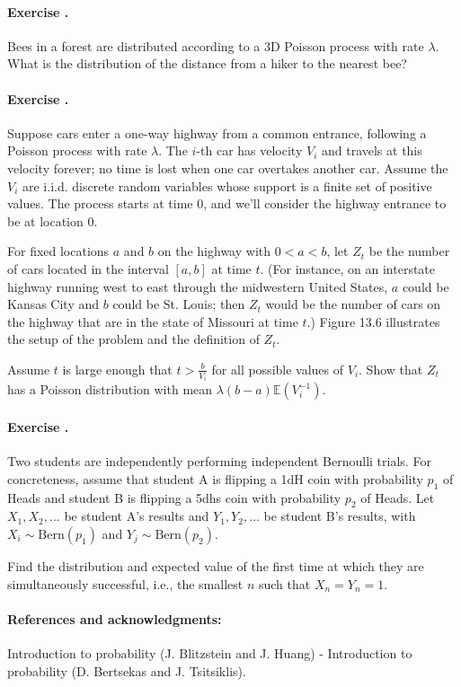 \documentclass[twocolumn,12pt,a4paper]{article}
\newcounter{num}  %
\begin{document}
	
	
	\paragraph{Exercise \thenum.}
	Bees in a forest are distributed according to a 3D Poisson process with rate $\lambda$. 
	What is the distribution of the distance from a hiker to the nearest bee?
	
	

\paragraph{Exercise \thenum.}
		Suppose cars enter a one-way highway from a common entrance, following a Poisson process with rate $\lambda$. The $i$-th car has velocity $V_i$ and travels at this velocity forever; no time is lost when one car overtakes another car. Assume the $V_i$ are i.i.d. discrete random variables whose support is a finite set of positive values. The process starts at time 0, and we'll consider the highway entrance to be at location 0.
		
		For fixed locations $a$ and $b$ on the highway with $0 < a < b$, let $Z_t$ be the number of cars located in the interval $[a, b]$ at time $t$. (For instance, on an interstate highway running west to east through the midwestern United States, $a$ could be Kansas City and $b$ could be St. Louis; then $Z_t$ would be the number of cars on the highway that are in the state of Missouri at time $t$.) Figure 13.6 illustrates the setup of the problem and the definition of $Z_t$.
		
		Assume $t$ is large enough that $t > \frac{b}{V_i}$ for all possible values of $V_i$. Show that $Z_t$ has a Poisson distribution with mean $\lambda(b - a) \mathbb{E}(V_i^{-1})$.
		
	
	\paragraph{Exercise \thenum.}
	Two students are independently performing independent Bernoulli trials. 
	For concreteness, assume that student A is flipping a 1dH coin with probability $p_1$ of Heads and student B is flipping a 5dhs coin with probability $p_2$ of Heads. 
	Let $X_1, X_2, \dots$ be student A's results and $Y_1, Y_2, \dots$ be student B's results, with $X_i \sim \text{Bern}(p_1)$ and $Y_j \sim \text{Bern}(p_2)$.
	
	Find the distribution and expected value of the first time at which they are simultaneously successful, i.e., the smallest $n$ such that $X_n = Y_n = 1$.
	
	
	\paragraph{References and acknowledgments:} Introduction to probability (J. Blitzstein and J. Huang) - Introduction to probability (D. Bertsekas and J.  Tsitsiklis).
\end{document}
